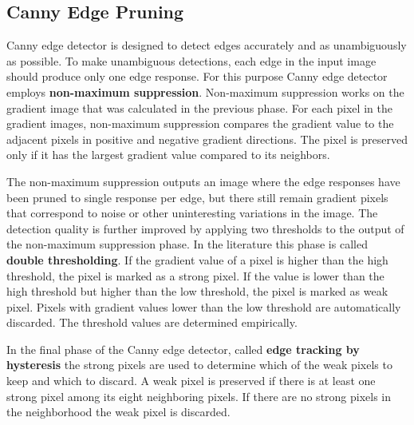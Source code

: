 \subsection{Canny Edge Pruning}
\label{subsec:canny-edge-pruning}
Canny edge detector is designed to detect edges accurately and as unambiguously as possible. To make unambiguous detections, each edge in the input image should produce only one edge response. For this purpose Canny edge detector employs \textbf{non-maximum suppression}. Non-maximum suppression works on the gradient image that was calculated in the previous phase. For each pixel in the gradient images, non-maximum suppression compares the gradient value to the adjacent pixels in positive and negative gradient directions. The pixel is preserved only if it has the largest gradient value compared to its neighbors.~\cite{gonzalez2008digital}

The non-maximum suppression outputs an image where the edge responses have been pruned to single response per edge, but there still remain gradient pixels that correspond to noise or other uninteresting variations in the image. The detection quality is further improved by applying two thresholds to the output of the non-maximum suppression phase. In the literature this phase is called \textbf{double thresholding}. If the gradient value of a pixel is higher than the high threshold, the pixel is marked as a strong pixel. If the value is lower than the high threshold but higher than the low threshold, the pixel is marked as weak pixel. Pixels with gradient values lower than the low threshold are automatically discarded. The threshold values are determined empirically.~\cite{gonzalez2008digital}

In the final phase of the Canny edge detector, called \textbf{edge tracking by hysteresis} the strong pixels are used to determine which of the weak pixels to keep and which to discard. A weak pixel is preserved if there is at least one strong pixel among its eight neighboring pixels. If there are no strong pixels in the neighborhood the weak pixel is discarded.~\cite{gonzalez2008digital}
